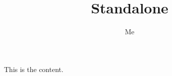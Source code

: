 \documentclass{article}
\title{Standalone}
\author{Me}
\begin{document}
  \maketitle
\fi

This is the content.

\ifdefined\ismaster
\else
  
\end{document}
